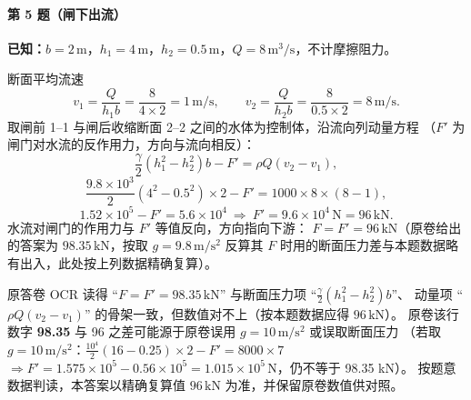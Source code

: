 \paragraph{第 5 题（闸下出流）}
\begin{jie}
\textbf{已知：}$b=2\,\mathrm{m}$，$h_1=4\,\mathrm{m}$，$h_2=0.5\,\mathrm{m}$，$Q=8\,\mathrm{m^3/s}$，不计摩擦阻力。

断面平均流速
\[
v_1=\frac{Q}{h_1b}=\frac{8}{4\times2}=1\,\mathrm{m/s},\qquad
v_2=\frac{Q}{h_2b}=\frac{8}{0.5\times2}=8\,\mathrm{m/s}.
\]
取闸前 1--1 与闸后收缩断面 2--2 之间的水体为控制体，沿流向列动量方程
（$F'$ 为闸门对水流的反作用力，方向与流向相反）：
\[
\frac{\gamma}{2}\left(h_1^{2}-h_2^{2}\right)b-F'=\rho Q(v_2-v_1),
\]
\[
\frac{9.8\times10^{3}}{2}\left(4^{2}-0.5^{2}\right)\times2-F'
=1000\times8\times(8-1),
\]
\[
1.52\times10^{5}-F'=5.6\times10^{4}\ \Longrightarrow\
F'=9.6\times10^{4}\,\mathrm{N}=96\,\mathrm{kN}.
\]
水流对闸门的作用力与 $F'$ 等值反向，方向指向下游：
$F=F'=96\,\mathrm{kN}$（原卷给出的答案为 $98.35\,\mathrm{kN}$，按取 $g=9.8\,\mathrm{m/s^2}$
反算其 $F$ 时用的断面压力差与本题数据略有出入，此处按上列数据精确复算）。
\end{jie}

\begin{tishi}
原答卷 OCR 读得 ``$F=F'=98.35\,\mathrm{kN}$'' 与断面压力项 ``$\frac{\gamma}{2}\left(h_1^{2}-h_2^{2}\right)b$''、
动量项 ``$\rho Q(v_2-v_1)$'' 的骨架一致，但数值对不上（按本题数据应得 $96\,\mathrm{kN}$）。
原卷该行数字 \textbf{98.35} 与 96 之差可能源于原卷误用 $g=10\,\mathrm{m/s^2}$ 或误取断面压力
（若取 $g=10\,\mathrm{m/s^2}$：$\frac{10^4}{2}(16-0.25)\times2-F'=8000\times7$
$\Rightarrow F'=1.575\times10^5-0.56\times10^5=1.015\times10^5\,\mathrm{N}$，仍不等于 98.35 kN）。
按题意数据判读，本答案以精确复算值 $96\,\mathrm{kN}$ 为准，并保留原卷数值供对照。
\end{tishi}

